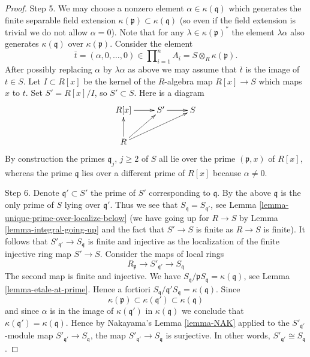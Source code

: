 \begin{proof}
\medskip\noindent
Step 5. We may choose a nonzero element $\alpha \in \kappa(\mathfrak q)$ which
generates the finite separable field extension
$\kappa(\mathfrak p) \subset \kappa(\mathfrak q)$ (so even if the
field extension is trivial we do not allow $\alpha = 0$).
Note that for any $\lambda \in \kappa(\mathfrak p)^*$ the
element $\lambda \alpha$ also generates $\kappa(\mathfrak q)$
over $\kappa(\mathfrak p)$. Consider the element
$$
\overline{t} =
(\alpha, 0, \ldots, 0) \in
\prod\nolimits_{i = 1}^n A_i =
S \otimes_R \kappa(\mathfrak p).
$$
After possibly replacing $\alpha$ by $\lambda \alpha$ as above
we may assume that $\overline{t}$ is the image of $t \in S$.
Let $I \subset R[x]$ be the kernel of the $R$-algebra
map $R[x] \to S$ which maps $x$ to $t$. Set $S' = R[x]/I$,
so $S' \subset S$. Here is a diagram
$$
\xymatrix{
R[x] \ar[r] & S' \ar[r] & S \\
R \ar[u] \ar[ru] \ar[rru] & &
}
$$
By construction the primes $\mathfrak q_j$, $j \geq 2$ of $S$ all
lie over the prime $(\mathfrak p, x)$ of $R[x]$, whereas
the prime $\mathfrak q$ lies over a different prime of $R[x]$
because $\alpha \not = 0$.

\medskip\noindent
Step 6. Denote $\mathfrak q' \subset S'$ the prime of $S'$
corresponding to $\mathfrak q$. By the above $\mathfrak q$ is
the only prime of $S$ lying over $\mathfrak q'$. Thus we see that
$S_{\mathfrak q} = S_{\mathfrak q'}$, see
Lemma \ref{lemma-unique-prime-over-localize-below} (we have
going up for $R \to S$ by Lemma \ref{lemma-integral-going-up}
and the fact that $S' \to S$ is finite as $R \to S$ is finite).
It follows that $S'_{\mathfrak q'} \to S_{\mathfrak q}$ is finite
and injective as the localization of the finite injective ring map
$S' \to S$. Consider the maps of local rings
$$
R_{\mathfrak p} \to S'_{\mathfrak q'} \to S_{\mathfrak q}
$$
The second map is finite and injective. We have
$S_{\mathfrak q}/\mathfrak pS_{\mathfrak q} = \kappa(\mathfrak q)$,
see Lemma \ref{lemma-etale-at-prime}.
Hence a fortiori
$S_{\mathfrak q}/\mathfrak q'S_{\mathfrak q} = \kappa(\mathfrak q)$.
Since
$$
\kappa(\mathfrak p) \subset \kappa(\mathfrak q') \subset \kappa(\mathfrak q)
$$
and since $\alpha$ is in the image of $\kappa(\mathfrak q')$ in
$\kappa(\mathfrak q)$
we conclude that $\kappa(\mathfrak q') = \kappa(\mathfrak q)$.
Hence by Nakayama's Lemma \ref{lemma-NAK} applied to the
$S'_{\mathfrak q'}$-module map $S'_{\mathfrak q'} \to S_{\mathfrak q}$,
the map $S'_{\mathfrak q'} \to S_{\mathfrak q}$ is surjective.
In other words,
$S'_{\mathfrak q'} \cong S_{\mathfrak q}$.


\end{proof}
